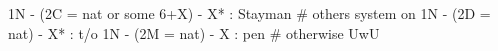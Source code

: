 1N - (2C = nat or some 6+X) - X* : Stayman  # others system on
1N - (2D = nat) - X* : t/o
1N - (2M = nat) - X  : pen
# otherwise UwU